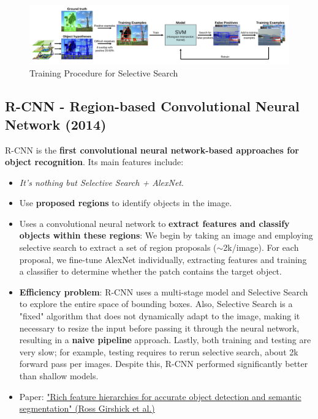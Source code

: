 \begin{figure}[!htbp]
    \centering
    \includegraphics[width=\linewidth]{tikz/chapter5 - Selective Search.png}
    \caption{Training Procedure for Selective Search}
    \label{fig:selective-search}
\end{figure}


\subsection{R-CNN - Region-based Convolutional Neural Network (2014)}
R-CNN is the \textbf{first convolutional neural network-based approaches for object recognition}. Its main features include:

\begin{itemize}
    \item \textit{It's nothing but Selective Search + AlexNet}.
    \item Use \textbf{proposed regions} to identify objects in the image.
    \item Uses a convolutional neural network to \textbf{extract features and classify objects within these regions}: We begin by taking an image and employing selective search to extract a set of region proposals ($\sim$2k/image). For each proposal, we fine-tune AlexNet individually, extracting features and training a classifier to determine whether the patch contains the target object.
    \item \textbf{Efficiency problem}: R-CNN uses a multi-stage model and Selective Search to explore the entire space of bounding boxes. Also, Selective Search is a "fixed" algorithm that does not dynamically adapt to the image, making it necessary to resize the input before passing it through the neural network, resulting in a \textbf{naive pipeline} approach. Lastly, both training and testing are very slow; for example, testing requires to rerun selective search, about 2k forward pass per images. Despite this, R-CNN performed significantly better than shallow models.
    \item Paper: \href{https://arxiv.org/pdf/1311.2524.pdf}{"Rich feature hierarchies for accurate object detection and semantic segmentation" (Ross Girshick et al.)}
\end{itemize}


